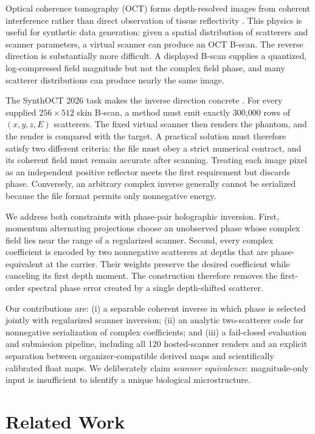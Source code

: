 \documentclass[runningheads]{llncs}
\newcommand{\method}{phase-pair holographic inversion}
\begin{document}
Optical coherence tomography (OCT) forms depth-resolved images from coherent
interference rather than direct observation of tissue reflectivity
\cite{huang1991oct}. This physics is useful for synthetic data generation:
given a spatial distribution of scatterers and scanner parameters, a virtual
scanner can produce an OCT B-scan. The reverse direction is substantially more
difficult. A displayed B-scan supplies a quantized, log-compressed field
magnitude but not the complex field phase, and many scatterer distributions
can produce nearly the same image.

The SynthOCT 2026 task makes the inverse direction concrete
\cite{matveev2026challenge}. For every supplied $256\!\times\!512$ skin B-scan,
a method must emit exactly 300,000 rows of $(x,y,z,E)$ scatterers. The fixed
virtual scanner then renders the phantom, and the render is compared with the
target. A practical solution must therefore satisfy two different criteria:
the file must obey a strict numerical contract, and its coherent field must
remain accurate after scanning. Treating each image pixel as an independent
positive reflector meets the first requirement but discards phase. Conversely,
an arbitrary complex inverse generally cannot be serialized because the file
format permits only nonnegative energy.

We address both constraints with \method. First, momentum alternating
projections choose an unobserved phase whose complex field lies near the range
of a regularized scanner. Second, every complex coefficient is encoded by two
nonnegative scatterers at depths that are phase-equivalent at the carrier.
Their weights preserve the desired coefficient while canceling its first
depth moment. The construction therefore removes the first-order spectral
phase error created by a single depth-shifted scatterer.

Our contributions are: (i) a separable coherent inverse in which phase is
selected jointly with regularized scanner inversion; (ii) an analytic
two-scatterer code for nonnegative serialization of complex coefficients; and
(iii) a fail-closed evaluation and submission pipeline, including all 120
hosted-scanner renders and an explicit separation between organizer-compatible
derived maps and scientifically calibrated float maps. We deliberately claim
\emph{scanner equivalence}: magnitude-only input is insufficient to identify a
unique biological microstructure.

\section{Related Work}
\end{document}
